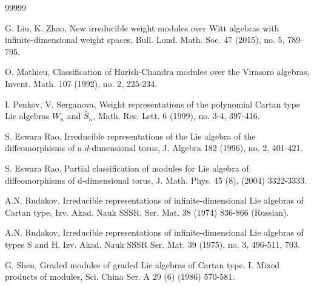 \documentclass[12pt,a4paper]{amsart}
\numberwithin{equation}{section}
\begin{document}
\begin{thebibliography}{99999}


G. Liu, K. Zhao, New irreducible weight modules over Witt algebras with infinite-dimensional weight spaces, Bull. Lond. Math. Soc. 47 (2015), no. 5, 789--795.


O. Mathieu, Classification of Harish-Chandra modules over the Virasoro algebras, Invent. Math. 107 (1992), no. 2, 225-234.




I. Penkov, V. Serganova, Weight representations of the polynomial Cartan type Lie algebras $W_n$ and $\bar{S}_n$, Math. Res. Lett. 6 (1999), no. 3-4, 397-416.



 S. Eswara Rao, Irreducible representations of
the Lie algebra of the diffeomorphisms of a $d$-dimensional torus,
J. Algebra 182 (1996),  no. 2, 401-421.

 S. Eswara Rao, Partial classification of modules for Lie algebra of
diffeomorphisms of d-dimensional torus, J. Math. Phys. 45 (8),
(2004) 3322-3333.


A.N. Rudakov, Irreducible representations of infinite-dimensional Lie algebras of Cartan type, Izv. Akad. Nauk SSSR, Ser. Mat. 38 (1974) 836-866 (Russian).

A.N. Rudakov, Irreducible representations of infinite-dimensional Lie algebras of types S and H, Izv. Akad. Nauk SSSR Ser. Mat. 39 (1975), no. 3, 496-511, 703.



G. Shen, Graded modules of graded Lie algebras of Cartan type. I. Mixed products of modules, Sci. China Ser. A 29 (6) (1986) 570-581.

%


\end{thebibliography}
\end{document}
